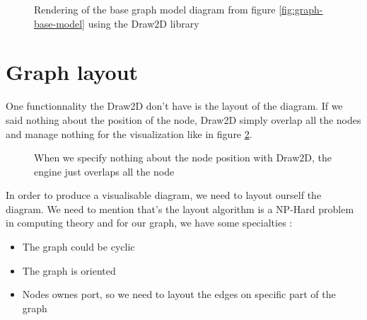 \begin{figure}[H]
  \centering
  \caption[Render of the base graph model using the Draw2D library]{Rendering of
    the base graph model diagram from figure \ref{fig:graph-base-model} using
    the Draw2D library}
  \label{fig:base-graph-model-html-draw2d}
\end{figure}

\section{Graph layout}
\label{sec:graph-layout}

One functionnality the Draw2D don't have is the layout of the diagram. If we
said nothing about the position of the node, Draw2D simply overlap all the nodes
and manage nothing for the visualization like in figure
\ref{fig:draw2d_overlapping}.

\begin{figure}[H]
  \centering
  \caption[Overlapping of nodes by Draw2D]{When we specify nothing about the
    node position with Draw2D, the engine just overlaps all the node}
  \label{fig:draw2d_overlapping}
\end{figure}

In order to produce a visualisable diagram, we need to layout ourself the
diagram. We need to mention that's the layout algorithm is a NP-Hard problem in
computing theory\cite{Tamassia:2007:HGD:1202383} and for our graph, we have some
specialties :

\begin{itemize}
\item The graph could be cyclic
\item The graph is oriented
\item Nodes ownes port, so we need to layout the edges on specific part of the graph
\end{itemize}


